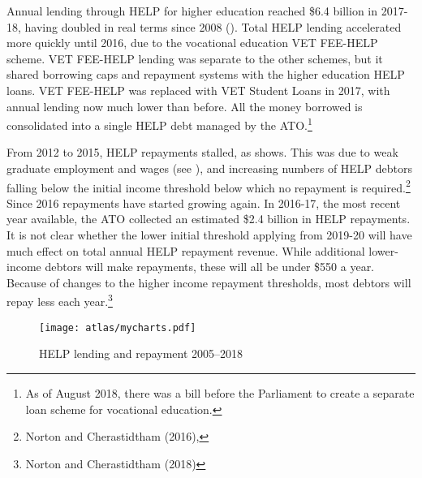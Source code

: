 \documentclass{grattan}
\begin{document}
Annual lending through HELP for higher education reached \$6.4 billion in 2017-18, having doubled in real terms since 2008 (). Total HELP lending accelerated more quickly until 2016, due to the vocational education VET FEE-HELP scheme. VET FEE-HELP lending was separate to the other schemes, but it shared borrowing caps and repayment systems with the higher education HELP loans. VET FEE-HELP was replaced with VET Student Loans in 2017, with annual lending now much lower than before. All the money borrowed is consolidated into a single HELP debt managed by the ATO.\footnote{As of August 2018, there was a bill before the Parliament to create a separate loan scheme for vocational education.}

From 2012 to 2015, HELP repayments stalled, as  shows. This was due to weak graduate employment and wages (see ), and increasing numbers of HELP debtors falling below the initial income threshold below which no repayment is required.\footnote{Norton and Cherastidtham (2016), } Since 2016 repayments have started growing again. In 2016-17, the most recent year available, the ATO collected an estimated \$2.4 billion in HELP repayments. It is not clear whether the lower initial threshold applying from 2019-20 will have much effect on total annual HELP repayment revenue. While additional lower-income debtors will make repayments, these will all be under \$550 a year. Because of changes to the higher income repayment thresholds, most debtors will repay less each year.\footnote{Norton and Cherastidtham (2018)}


    \begin{figure} %
    \caption{HELP lending and repayment 2005--2018}\label{fig:help-lending-and-repayment-20052018}
    \texttt{[image: atlas/mycharts.pdf]}
    \end{figure}
\end{document}
